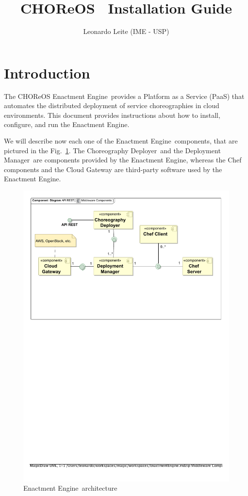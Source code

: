 \documentclass[a4paper, 10pt]{article}
\title{CHOReOS \ee\ Installation Guide}
\author{Leonardo Leite (IME - USP)}
\newcommand{\ee}{Enactment Engine}
\newcommand{\cd}{Choreography Deployer}
\newcommand{\dm}{Deployment Manager}
\begin{document}
\maketitle

\section{Introduction}

The CHOReOS \ee\ provides a Platform as a Service (PaaS) that automates the distributed deployment of service choreographies in cloud environments. This document provides instructions about how to install, configure, and run the \ee.

We will describe now each one of the \ee\ components, that are pictured in the Fig.~\ref{fig:ee_components}. The \cd\ and the \dm\ are components provided by the \ee, whereas the Chef components and the Cloud Gateway are third-party software used by the \ee.

\begin{figure}
\centering
\includegraphics[scale=0.7]{img/components.pdf}
\caption{\ee\ architecture}
\label{fig:ee_components}
\end{figure}
\end{document}
